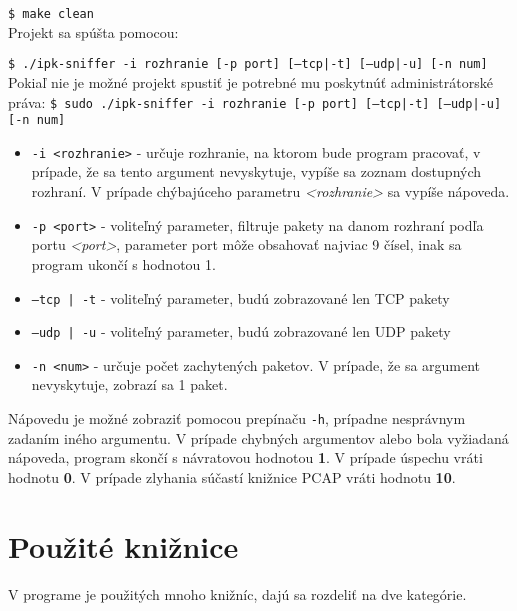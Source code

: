 \documentclass[11pt, a4paper]{article}
\begin{document}
\texttt{\$ make clean}\\
Projekt sa spúšta pomocou:

\texttt{\$ ./ipk-sniffer -i rozhranie [-p ­­port] [--tcp|-t] [--udp|-u] [-n num]}\\
Pokiaľ nie je možné projekt spustiť je potrebné mu poskytnúť administrátorské práva:
\label{vstupne argumenty}
\texttt{\$ sudo ./ipk-sniffer -i rozhranie [-p ­­port] [--tcp|-t] [--udp|-u] [-n num]}\\
\begin{itemize}
\item \texttt{-i <rozhranie>} - určuje rozhranie, na ktorom bude program pracovať, v prípade, že sa tento argument nevyskytuje, vypíše sa zoznam dostupných rozhraní. V prípade chýbajúceho parametru \emph{<rozhranie>} sa vypíše nápoveda.
\item \texttt{-p <port>} - voliteľný parameter, filtruje pakety na danom rozhraní podľa portu \emph{<port>}, parameter port môže obsahovať najviac 9 čísel, inak sa program ukončí s hodnotou 1.
\item \texttt{--tcp |\,-t} - voliteľný parameter, budú zobrazované len TCP pakety
\item \texttt{--udp |\,-u} - voliteľný parameter, budú zobrazované len UDP pakety
\item \texttt{-n <num>} - určuje počet zachytených paketov. V prípade, že sa argument nevyskytuje, zobrazí sa 1 paket. 
\end{itemize}
Nápovedu je možné zobraziť pomocou prepínaču \texttt{-h}, prípadne nesprávnym zadaním iného argumentu.
V prípade chybných argumentov alebo bola vyžiadaná nápoveda, program skončí s návratovou hodnotou \textbf{1}.
V prípade úspechu vráti hodnotu \textbf{0}.
V prípade zlyhania súčastí knižnice PCAP vráti hodnotu \textbf{10}.
	
	\section{Použité knižnice}
	V programe je použitých mnoho knižníc, dajú sa rozdeliť na dve kategórie. 
	
\end{document}
